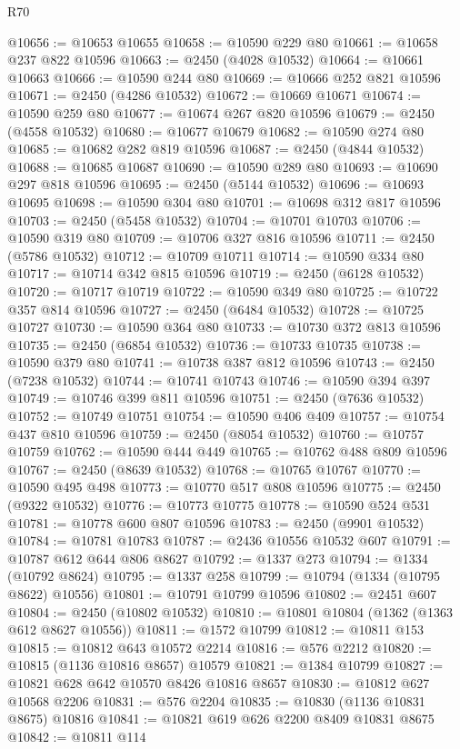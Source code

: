 \begin{lexlean}{R70}
\begin{coremodule}
@10656 := @10653 @10655
@10658 := @10590 @229 @80
@10661 := @10658 @237 @822 @10596
@10663 := @2450 (@4028 @10532)
@10664 := @10661 @10663
@10666 := @10590 @244 @80
@10669 := @10666 @252 @821 @10596
@10671 := @2450 (@4286 @10532)
@10672 := @10669 @10671
@10674 := @10590 @259 @80
@10677 := @10674 @267 @820 @10596
@10679 := @2450 (@4558 @10532)
@10680 := @10677 @10679
@10682 := @10590 @274 @80
@10685 := @10682 @282 @819 @10596
@10687 := @2450 (@4844 @10532)
@10688 := @10685 @10687
@10690 := @10590 @289 @80
@10693 := @10690 @297 @818 @10596
@10695 := @2450 (@5144 @10532)
@10696 := @10693 @10695
@10698 := @10590 @304 @80
@10701 := @10698 @312 @817 @10596
@10703 := @2450 (@5458 @10532)
@10704 := @10701 @10703
@10706 := @10590 @319 @80
@10709 := @10706 @327 @816 @10596
@10711 := @2450 (@5786 @10532)
@10712 := @10709 @10711
@10714 := @10590 @334 @80
@10717 := @10714 @342 @815 @10596
@10719 := @2450 (@6128 @10532)
@10720 := @10717 @10719
@10722 := @10590 @349 @80
@10725 := @10722 @357 @814 @10596
@10727 := @2450 (@6484 @10532)
@10728 := @10725 @10727
@10730 := @10590 @364 @80
@10733 := @10730 @372 @813 @10596
@10735 := @2450 (@6854 @10532)
@10736 := @10733 @10735
@10738 := @10590 @379 @80
@10741 := @10738 @387 @812 @10596
@10743 := @2450 (@7238 @10532)
@10744 := @10741 @10743
@10746 := @10590 @394 @397
@10749 := @10746 @399 @811 @10596
@10751 := @2450 (@7636 @10532)
@10752 := @10749 @10751
@10754 := @10590 @406 @409
@10757 := @10754 @437 @810 @10596
@10759 := @2450 (@8054 @10532)
@10760 := @10757 @10759
@10762 := @10590 @444 @449
@10765 := @10762 @488 @809 @10596
@10767 := @2450 (@8639 @10532)
@10768 := @10765 @10767
@10770 := @10590 @495 @498
@10773 := @10770 @517 @808 @10596
@10775 := @2450 (@9322 @10532)
@10776 := @10773 @10775
@10778 := @10590 @524 @531
@10781 := @10778 @600 @807 @10596
@10783 := @2450 (@9901 @10532)
@10784 := @10781 @10783
@10787 := @2436 @10556 @10532 @607
@10791 := @10787 @612 @644 @806 @8627
@10792 := @1337 @273
@10794 := @1334 (@10792 @8624)
@10795 := @1337 @258
@10799 := @10794 (@1334 (@10795 @8622) @10556)
@10801 := @10791 @10799 @10596
@10802 := @2451 @607
@10804 := @2450 (@10802 @10532)
@10810 := @10801 @10804 (@1362 (@1363 @612 @8627 @10556))
@10811 := @1572 @10799
@10812 := @10811 @153
@10815 := @10812 @643 @10572 @2214
@10816 := @576 @2212
@10820 := @10815 (@1136 @10816 @8657) @10579
@10821 := @1384 @10799
@10827 := @10821 @628 @642 @10570 @8426 @10816 @8657
@10830 := @10812 @627 @10568 @2206
@10831 := @576 @2204
@10835 := @10830 (@1136 @10831 @8675) @10816
@10841 := @10821 @619 @626 @2200 @8409 @10831 @8675
@10842 := @10811 @114

\end{coremodule}
\end{lexlean}
